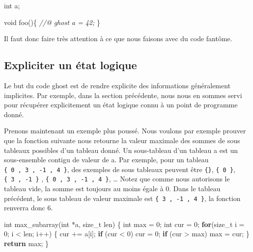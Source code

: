 \documentclass[12pt,francais,]{scrbook}
\newenvironment{Shaded}{}{}
\newcommand{\KeywordTok}[1]{\textcolor[rgb]{0.00,0.44,0.13}{\textbf{{#1}}}}
\newcommand{\DataTypeTok}[1]{\textcolor[rgb]{0.56,0.13,0.00}{{#1}}}
\newcommand{\DecValTok}[1]{\textcolor[rgb]{0.25,0.63,0.44}{{#1}}}
\newcommand{\CommentTok}[1]{\textcolor[rgb]{0.38,0.63,0.69}{\textit{{#1}}}}
\newcommand{\NormalTok}[1]{{#1}}
\begin{document}
\begin{footnotesize}\begin{Shaded}
\begin{Highlighting}[]
\DataTypeTok{int} \NormalTok{a;}

\DataTypeTok{void} \NormalTok{foo()\{}
  \CommentTok{//@ ghost a = 42;}
\NormalTok{\}}
\end{Highlighting}
\end{Shaded}\end{footnotesize}

Il faut donc faire très attention à ce que nous faisons avec du code
fantôme.

\subsection{Expliciter un état
logique}\label{expliciter-un-uxe9tat-logique}

Le but du code ghost est de rendre explicite des informations
généralement implicites. Par exemple, dans la section précédente, nous
nous en sommes servi pour récupérer explicitement un état logique connu
à un point de programme donné.

Prenons maintenant un exemple plus poussé. Nous voulons par exemple
prouver que la fonction suivante nous retourne la valeur maximale des
sommes de sous tableaux possibles d'un tableau donné. Un sous-tableau
d'un tableau \og{}a\fg{} est un sous-ensemble contigu de valeur de \og{}a\fg{}. Par
exemple, pour un tableau \texttt{\{\ 0\ ,\ 3\ ,\ -1\ ,\ 4\ \}}, des
exemples de sous tableaux peuvent être \texttt{\{\}},
\texttt{\{\ 0\ \}}, \texttt{\{\ 3\ ,\ -1\ \}} ,
\texttt{\{\ 0\ ,\ 3\ ,\ -1\ ,\ 4\ \}}, \ldots{} Notez que comme nous
autorisons le tableau vide, la somme est toujours au moins égale à 0.
Dans le tableau précédent, le sous tableau de valeur maximale est
\texttt{\{\ 3\ ,\ -1\ ,\ 4\ \}}, la fonction renverra donc 6.

\begin{footnotesize}\begin{Shaded}
\begin{Highlighting}[]
\DataTypeTok{int} \NormalTok{max_subarray(}\DataTypeTok{int} \NormalTok{*a, size_t len) \{}
  \DataTypeTok{int} \NormalTok{max = }\DecValTok{0}\NormalTok{;}
  \DataTypeTok{int} \NormalTok{cur = }\DecValTok{0}\NormalTok{;}
  \KeywordTok{for}\NormalTok{(size_t i = }\DecValTok{0}\NormalTok{; i < len; i++) \{}
    \NormalTok{cur += a[i];}
    \KeywordTok{if} \NormalTok{(cur < }\DecValTok{0}\NormalTok{)   cur = }\DecValTok{0}\NormalTok{;}
    \KeywordTok{if} \NormalTok{(cur > max) max = cur;}
  \NormalTok{\}}
  \KeywordTok{return} \NormalTok{max;}
\NormalTok{\}}
\end{Highlighting}
\end{Shaded}\end{footnotesize}
\end{document}
